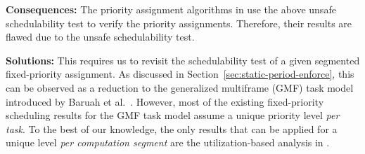 {\bf Consequences:} The priority assignment algorithms in \cite{RTSS-KimANR13,DBLP:journals/ieicet/DingTT09} use the above unsafe schedulability test to verify the priority assignments. Therefore, their results are flawed due to the unsafe schedulability test.

{\bf Solutions:} This requires us to revisit the schedulability test of a given segmented fixed-priority assignment. As discussed in Section~\ref{sec:static-period-enforce}, this can be observed as a reduction to 
the generalized multiframe (GMF) task model introduced by Baruah et al.~\cite{baruah1999generalized}. However, most of the existing fixed-priority scheduling results for the GMF task model assume a unique priority level \emph{per task}. To the best of our knowledge, the only results that can be applied for a unique level \emph{per computation segment} are the utilization-based analysis in \cite{DBLP:journals/corr/ChenHL15b,huang2015mode}. 



\label{sec:wrong-jitter-convert-sporadic}





